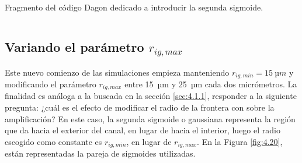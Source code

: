 \begin{longlisting}
  \caption{Fragmento del código Dagon dedicado a introducir la segunda sigmoide.}
  \inputminted[firstline=1, lastline=84]{fortran}{Programas/plasma3Dss.f90}
  \label{cod:4.5}
\end{longlisting}

\subsection{Variando el parámetro $r_{ig,max}$}\label{sec:4.2.1}
Este nuevo comienzo de las simulaciones empieza manteniendo $r_{ig,min}=\qty{15}{µm}$ y modificando el parámetro $r_{ig,max}$ entre \qty{15}{µm} y \qty{25}{µm} cada dos micrómetros. La finalidad es análoga a la buscada en la sección \ref{sec:4.1.1}, responder a la siguiente pregunta: ¿cuál es el efecto de modificar el radio de la frontera con  sobre la amplificación? En este caso, la segunda sigmoide o gaussiana representa la región que da hacia el exterior del canal, en lugar de hacia el interior, luego el radio escogido como constante es $r_{ig,min}$, en lugar de $r_{ig,max}$. En la Figura \ref{fig:4.20}, están representadas la pareja de sigmoides utilizadas.

